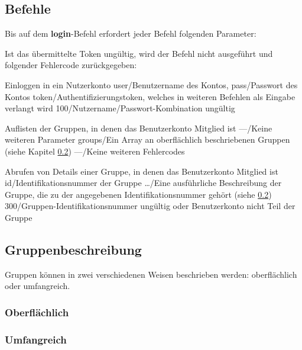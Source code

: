 \documentclass[parskip=full,11pt]{scrartcl}
\begin{document}
\subsection{Befehle}
Bis auf dem \textbf{login}-Befehl erfordert jeder Befehl folgenden
Parameter:\\
\par\par Ist das übermittelte Token ungültig, wird der Befehl nicht
ausgeführt und folgender Fehlercode zurückgegeben:\\

{Einloggen in ein Nutzerkonto}
{user/Benutzername des Kontos,
pass/Passwort des Kontos}
{token/Authentifizierungstoken{,} welches in weiteren Befehlen
als Eingabe verlangt wird}
{100/Nutzername{/}Passwort-Kombination ungültig}

{Auflisten der Gruppen, in denen das Benutzerkonto Mitglied ist}
{---/Keine weiteren Parameter}
{groups/Ein Array an oberflächlich beschriebenen Gruppen (siehe
Kapitel \ref{sec:groupdesc})}
{---/Keine weiteren Fehlercodes}

{Abrufen von Details einer Gruppe, in denen das Benutzerkonto Mitglied ist}
{id/Identifikationsnummer der Gruppe}
{\dots/Eine ausführliche Beschreibung der Gruppe{,} die zu der angegebenen
Identifikationsnummer gehört (siehe \ref{sec:groupdesc})}
{300/Gruppen-Identifikationsnummer ungültig oder Benutzerkonto nicht Teil der
Gruppe}

\subsection{Gruppenbeschreibung}\label{sec:groupdesc}
Gruppen können in zwei verschiedenen Weisen beschrieben werden:
oberflächlich oder umfangreich.

\subsubsection{Oberflächlich}

\subsubsection{Umfangreich}
\end{document}
